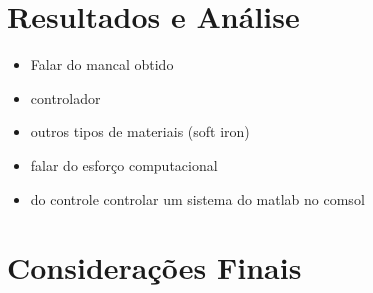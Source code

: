 \documentclass[twoside,a4paper,12pt]{report}
\begin{document}


\chapter{Resultados e Análise}

\begin{itemize}
	\item Falar do mancal obtido
	\item controlador
	\item outros tipos de materiais (soft iron)
	\item falar do esforço computacional
	\item do controle controlar um sistema do matlab no comsol
\end{itemize}

\chapter{Considerações Finais}









\end{document}
